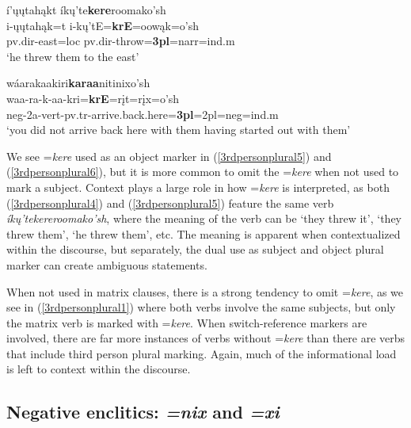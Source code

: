 \begin{exe}
\begin{xlist}
	\item\label{3rdpersonplural5}
	\glll í'ųųtahąkt íkų'te\textbf{kere}roomako'sh\\
	i-ųųtahąk=t i-kų'tE=\textbf{krE}=oowąk=o'sh\\
	pv.dir-\textnormal{east}=loc pv.dir-\textnormal{throw}=\textbf{3pl}=narr=ind.m\\
	\glt `he threw them to the east' \citep[13]{hollow1973a}

	\item\label{3rdpersonplural6}
	\glll wáarakaakiri\textbf{karaa}nitinixo'sh\\
	waa-ra-k-aa-kri=\textbf{krE}=rįt=rįx=o'sh\\
	neg-2a-vert-pv.tr-\textnormal{arrive.back.here}=\textbf{3pl}=2pl=neg=ind.m\\
	\glt `you did not arrive back here with them having started out with them' \citep[447]{hollow1970}
	
	\end{xlist}
	
\end{exe}

We see =\textit{kere} used as an object marker in (\ref{3rdpersonplural5}) and (\ref{3rdpersonplural6}), but it is more common to omit the =\textit{kere} when not used to mark a subject. Context plays a large role in how =\textit{kere} is interpreted, as both (\ref{3rdpersonplural4}) and (\ref{3rdpersonplural5}) feature the same verb \textit{íkų'tekereroomako'sh}, where the meaning of the verb can be `they threw it', `they threw them', `he threw them', etc. The meaning is apparent when contextualized within the discourse, but separately, the dual use as subject and object plural marker can create ambiguous statements.

When not used in matrix clauses, there is a strong tendency to omit =\textit{kere}, as we see in (\ref{3rdpersonplural1}) where both verbs involve the same subjects, but only the matrix verb is marked with =\textit{kere}. When switch-reference markers are involved, there are far more instances of verbs without =\textit{kere} than there are verbs that include third person plural marking. Again, much of the informational load is left to context within the discourse. 

\subsection{Negative enclitics: \textit{=nix} and \textit{=xi}}\label{Ch3NegativeEnclitics}

